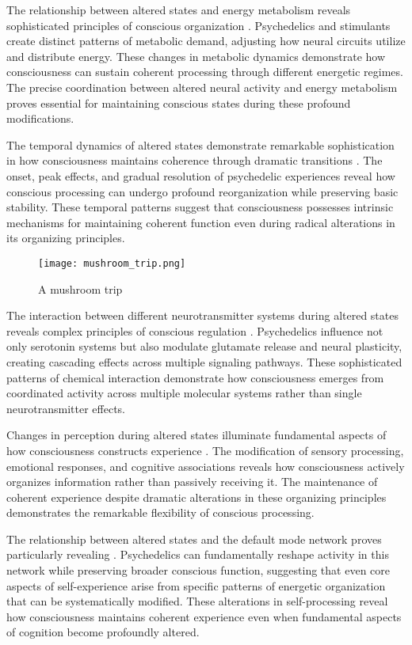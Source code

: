 \begin{refsection}
The relationship between altered states and energy metabolism reveals sophisticated principles of conscious organization \cite{Vaitl2005}. Psychedelics and stimulants create distinct patterns of metabolic demand, adjusting how neural circuits utilize and distribute energy. These changes in metabolic dynamics demonstrate how consciousness can sustain coherent processing through different energetic regimes. The precise coordination between altered neural activity and energy metabolism proves essential for maintaining conscious states during these profound modifications.

The temporal dynamics of altered states demonstrate remarkable sophistication in how consciousness maintains coherence through dramatic transitions \cite{Vollenweider2020}. The onset, peak effects, and gradual resolution of psychedelic experiences reveal how conscious processing can undergo profound reorganization while preserving basic stability. These temporal patterns suggest that consciousness possesses intrinsic mechanisms for maintaining coherent function even during radical alterations in its organizing principles.

\begin{figure}[h]
    \centering
    \texttt{[image: mushroom\_trip.png]}

    \caption{A mushroom trip}
\end{figure}

The interaction between different neurotransmitter systems during altered states reveals complex principles of conscious regulation \cite{Ludwig1966}. Psychedelics influence not only serotonin systems but also modulate glutamate release and neural plasticity, creating cascading effects across multiple signaling pathways. These sophisticated patterns of chemical interaction demonstrate how consciousness emerges from coordinated activity across multiple molecular systems rather than single neurotransmitter effects.

Changes in perception during altered states illuminate fundamental aspects of how consciousness constructs experience \cite{Dittrich2010}. The modification of sensory processing, emotional responses, and cognitive associations reveals how consciousness actively organizes information rather than passively receiving it. The maintenance of coherent experience despite dramatic alterations in these organizing principles demonstrates the remarkable flexibility of conscious processing.

The relationship between altered states and the default mode network proves particularly revealing \cite{CarhartHarris2019}. Psychedelics can fundamentally reshape activity in this network while preserving broader conscious function, suggesting that even core aspects of self-experience arise from specific patterns of energetic organization that can be systematically modified. These alterations in self-processing reveal how consciousness maintains coherent experience even when fundamental aspects of cognition become profoundly altered.


\end{refsection}
